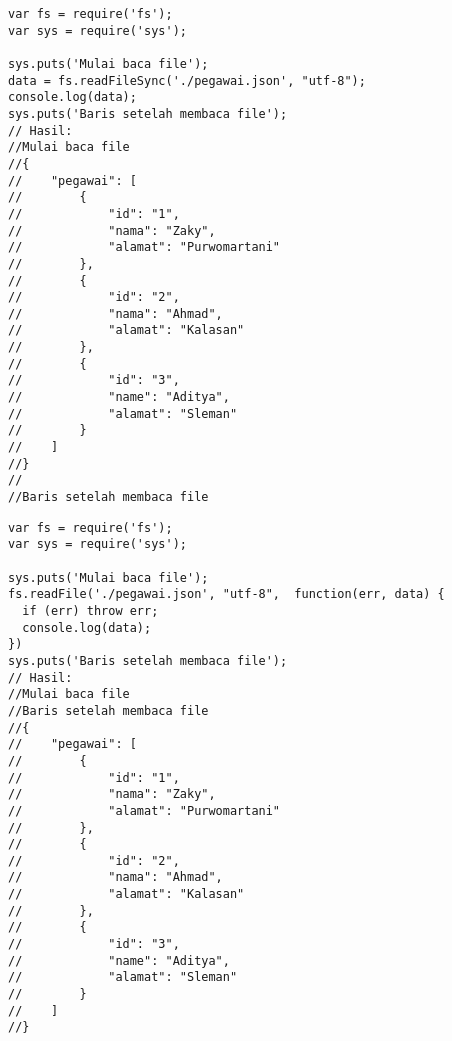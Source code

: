 \lstset{language=JavaScript,caption=Membaca file secara synchronous}
\begin{lstlisting}
var fs = require('fs');
var sys = require('sys');

sys.puts('Mulai baca file');
data = fs.readFileSync('./pegawai.json', "utf-8");
console.log(data);
sys.puts('Baris setelah membaca file');
// Hasil:
//Mulai baca file
//{
//    "pegawai": [
//        {
//            "id": "1",
//            "nama": "Zaky",
//            "alamat": "Purwomartani"
//        },
//        {
//            "id": "2",
//            "nama": "Ahmad",
//            "alamat": "Kalasan"
//        },
//        {
//            "id": "3",
//            "name": "Aditya",
//            "alamat": "Sleman"
//        }
//    ]
//}
//
//Baris setelah membaca file
\end{lstlisting}

\lstset{language=JavaScript,caption=Membaca file secara asynchronous}
\begin{lstlisting}
var fs = require('fs');
var sys = require('sys');

sys.puts('Mulai baca file');
fs.readFile('./pegawai.json', "utf-8",  function(err, data) {
  if (err) throw err;
  console.log(data);
})
sys.puts('Baris setelah membaca file');
// Hasil:
//Mulai baca file
//Baris setelah membaca file
//{
//    "pegawai": [
//        {
//            "id": "1",
//            "nama": "Zaky",
//            "alamat": "Purwomartani"
//        },
//        {
//            "id": "2",
//            "nama": "Ahmad",
//            "alamat": "Kalasan"
//        },
//        {
//            "id": "3",
//            "name": "Aditya",
//            "alamat": "Sleman"
//        }
//    ]
//}
\end{lstlisting}

